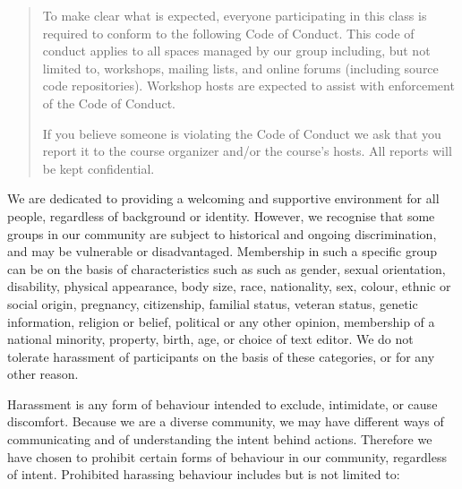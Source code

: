 
\begin{quotation}

  To make clear what is expected, everyone participating in this class
  is required to conform to the following Code of Conduct. This code
  of conduct applies to all spaces managed by our group including, but
  not limited to, workshops, mailing lists, and online forums
  (including source code repositories).  Workshop hosts are expected
  to assist with enforcement of the Code of Conduct.

  If you believe someone is violating the Code of Conduct we ask that
  you report it to the course organizer and/or the course's hosts.
  All reports will be kept confidential.

\end{quotation}

We are dedicated to providing a welcoming and supportive environment
for all people, regardless of background or identity.  However, we
recognise that some groups in our community are subject to historical
and ongoing discrimination, and may be vulnerable or disadvantaged.
Membership in such a specific group can be on the basis of
characteristics such as such as gender, sexual orientation,
disability, physical appearance, body size, race, nationality, sex,
colour, ethnic or social origin, pregnancy, citizenship, familial
status, veteran status, genetic information, religion or belief,
political or any other opinion, membership of a national minority,
property, birth, age, or choice of text editor.  We do not tolerate
harassment of participants on the basis of these categories, or for
any other reason.

Harassment is any form of behaviour intended to exclude, intimidate,
or cause discomfort.  Because we are a diverse community, we may have
different ways of communicating and of understanding the intent behind
actions.  Therefore we have chosen to prohibit certain forms of
behaviour in our community, regardless of intent.  Prohibited
harassing behaviour includes but is not limited to:

